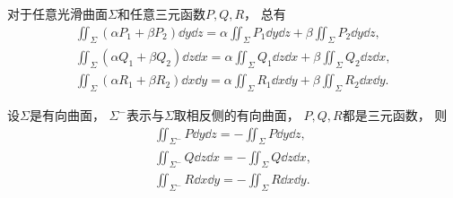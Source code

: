 \begin{property}
对于任意光滑曲面\(\Sigma\)和任意三元函数\(P,Q,R\)，
总有\begin{gather}
	\iint_\Sigma (\alpha P_1 + \beta P_2) \dd{y}\dd{z}
	= \alpha \iint_\Sigma P_1 \dd{y}\dd{z}
	+ \beta \iint_\Sigma P_2 \dd{y}\dd{z}, \\
	\iint_\Sigma (\alpha Q_1 + \beta Q_2) \dd{z}\dd{x}
	= \alpha \iint_\Sigma Q_1 \dd{z}\dd{x}
	+ \beta \iint_\Sigma Q_2 \dd{z}\dd{x}, \\
	\iint_\Sigma (\alpha R_1 + \beta R_2) \dd{x}\dd{y}
	= \alpha \iint_\Sigma R_1 \dd{x}\dd{y}
	+ \beta \iint_\Sigma R_2 \dd{x}\dd{y}.
\end{gather}
\end{property}

\begin{property}
设\(\Sigma\)是有向曲面，
\(\Sigma^-\)表示与\(\Sigma\)取相反侧的有向曲面，
\(P,Q,R\)都是三元函数，
则\begin{gather}
	\iint_{\Sigma^-} P \dd{y}\dd{z}
	= -\iint_\Sigma P \dd{y}\dd{z}, \\
	\iint_{\Sigma^-} Q \dd{z}\dd{x}
	= -\iint_\Sigma Q \dd{z}\dd{x}, \\
	\iint_{\Sigma^-} R \dd{x}\dd{y}
	= -\iint_\Sigma R \dd{x}\dd{y}.
\end{gather}
\end{property}

